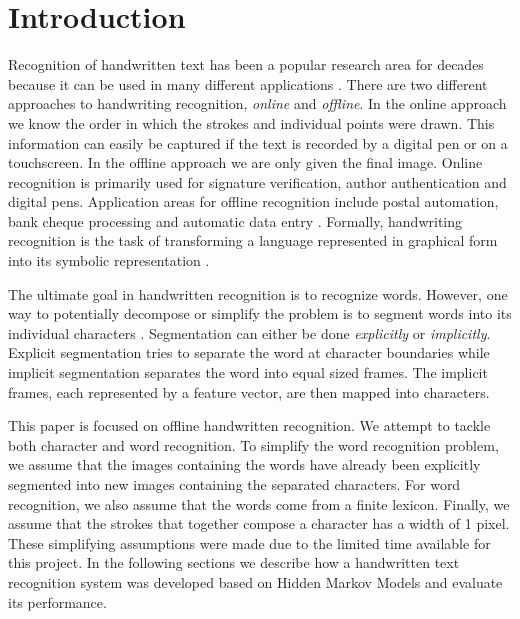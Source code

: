 \section{Introduction}\label{sec:introduction}

Recognition of handwritten text has been a popular research area for decades because it can be used in many different applications  \cite{intro1}. %
There are two different approaches to handwriting recognition, \textit{online} and \textit{offline}.
In the online approach we know the order in which the strokes and individual points were drawn.
This information can easily be captured if the text is recorded by a digital pen or on a touchscreen.
In the offline approach we are only given the final image.
Online recognition is primarily used for signature verification, author authentication and digital pens.
Application areas for offline recognition include postal automation, bank cheque processing and automatic data entry \cite{intro1}.
Formally, handwriting recognition is the task of transforming a language represented in graphical form into its symbolic representation \cite{introsurvey}.

The ultimate goal in handwritten recognition is to recognize words.
However, one way to potentially decompose or simplify the problem is to segment words into its individual characters \cite{intro-Yacoubi}. 
Segmentation can either be done \textit{explicitly} or \textit{implicitly}.
Explicit segmentation tries to separate the word at character boundaries while implicit segmentation separates the word into equal sized frames.
The implicit frames, each represented by a feature vector, are then mapped into characters.

This paper is focused on offline handwritten recognition.
We attempt to tackle both character and word recognition.
To simplify the word recognition problem, we assume that the images containing the words have already been explicitly segmented into new images containing the separated characters.
For word recognition, we also assume that the words come from a finite lexicon.
Finally, we assume that the strokes that together compose a character has a width of 1 pixel.
These simplifying assumptions were made due to the limited time available for this project.
In the following sections we describe how a handwritten text recognition system was developed based on Hidden Markov Models and evaluate its performance.

